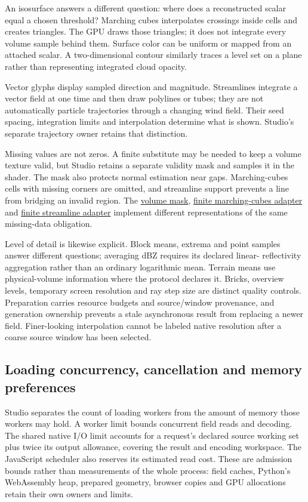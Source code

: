 \documentclass[
  11pt,
]{article}
\begin{document}
An isosurface answers a different question: where does a reconstructed
scalar equal a chosen threshold? Marching cubes interpolates crossings
inside cells and creates triangles. The GPU draws those triangles; it
does not integrate every volume sample behind them. Surface color can be
uniform or mapped from an attached scalar. A two-dimensional contour
similarly traces a level set on a plane rather than representing
integrated cloud opacity.

Vector glyphs display sampled direction and magnitude. Streamlines
integrate a vector field at one time and then draw polylines or tubes;
they are not automatically particle trajectories through a changing wind
field. Their seed spacing, integration limits and interpolation
determine what is shown. Studio's separate trajectory owner retains that
distinction.

Missing values are not zeros. A finite substitute may be needed to keep
a volume texture valid, but Studio retains a separate validity mask and
samples it in the shader. The mask also protects normal estimation near
gaps. Marching-cubes cells with missing corners are omitted, and
streamline support prevents a line from bridging an invalid region. The
\href{../ui/src/lib/vtk/volumeValidity.ts}{volume mask},
\href{../ui/src/lib/vtk/finiteImageMarchingCubes.ts}{finite
marching-cubes adapter} and
\href{../ui/src/lib/vtk/finiteImageStreamline.ts}{finite streamline
adapter} implement different representations of the same missing-data
obligation.

Level of detail is likewise explicit. Block means, extrema and point
samples answer different questions; averaging dBZ requires its declared
linear- reflectivity aggregation rather than an ordinary logarithmic
mean. Terrain means use physical-volume information where the protocol
declares it. Bricks, overview levels, temporary screen resolution and
ray step size are distinct quality controls. Preparation carries
resource budgets and source/window provenance, and generation ownership
prevents a stale asynchronous result from replacing a newer field.
Finer-looking interpolation cannot be labeled native resolution after a
coarse source window has been selected.

\subsection{Loading concurrency, cancellation and memory preferences}

Studio separates the count of loading workers from the amount of memory
those workers may hold. A worker limit bounds concurrent field reads and
decoding. The shared native I/O limit accounts for a request's declared source
working set plus twice its output allowance, covering the result and encoding
workspace. The JavaScript scheduler also reserves its estimated read cost.
These are admission bounds rather than measurements of the whole process:
field caches, Python's WebAssembly heap, prepared geometry, browser copies and
GPU allocations retain their own owners and limits.
\end{document}
